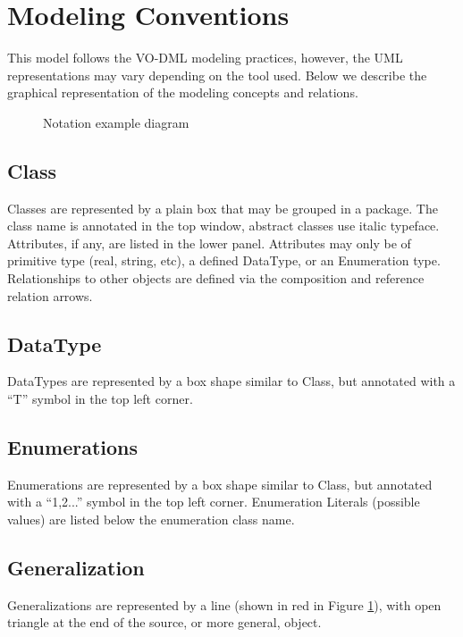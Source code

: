 \pagebreak
\section{Modeling Conventions}
This model follows the VO-DML modeling practices, however, the UML representations may vary depending on the tool used.  Below we describe the graphical representation of the modeling concepts and relations.

  \begin{figure}[h]
  \begin{center}
    \caption{Notation example diagram}\label{fig:notation_example}
  \end{center}
  \end{figure}

  \subsection{Class}
  \label{sect:Class}
  Classes are represented by a plain box that may be grouped in a package. The class name is annotated in the top window, abstract
classes use italic typeface. Attributes, if any, are listed in the lower panel. Attributes may only be
of primitive type (real, string, etc), a defined DataType, or an Enumeration type. Relationships to
other objects are defined via the composition and reference relation arrows.

  \subsection{DataType}
  \label{sect:DataType}
  DataTypes are represented by a box shape similar to Class, but annotated with a ``T'' symbol in the top left corner.

  \subsection{Enumerations}
  \label{sect:Enumerations}
  Enumerations are represented by a box shape similar to Class, but annotated with a ``1,2...''
symbol in the top left corner. Enumeration Literals (possible values) are listed below the
enumeration class name.

  \subsection{Generalization}
  \label{sect:Generalization}
  Generalizations are represented by a line (shown in red in Figure \ref{fig:notation_example}), with open triangle at the end of the source, or more general, object.

